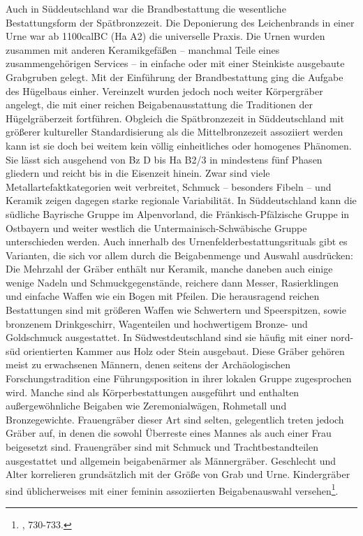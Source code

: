 \documentclass[openany,twoside,twocolumn]{book}
\let\rmarkdownfootnote\footnote%
\def\footnote{\protect\rmarkdownfootnote}
\begin{document}
Auch in Süddeutschland war die Brandbestattung die wesentliche
Bestattungsform der Spätbronzezeit. Die Deponierung des Leichenbrands in
einer Urne war ab 1100calBC (Ha A2) die universelle Praxis. Die Urnen
wurden zusammen mit anderen Keramikgefäßen -- manchmal Teile eines
zusammengehörigen Services -- in einfache oder mit einer Steinkiste
ausgebaute Grabgruben gelegt. Mit der Einführung der Brandbestattung
ging die Aufgabe des Hügelbaus einher. Vereinzelt wurden jedoch noch
weiter Körpergräber angelegt, die mit einer reichen Beigabenausstattung
die Traditionen der Hügelgräberzeit fortführen. Obgleich die
Spätbronzezeit in Süddeutschland mit größerer kultureller
Standardisierung als die Mittelbronzezeit assoziiert werden kann ist sie
doch bei weitem kein völlig einheitliches oder homogenes Phänomen. Sie
lässt sich ausgehend von Bz D bis Ha B2/3 in mindestens fünf Phasen
gliedern und reicht bis in die Eisenzeit hinein. Zwar sind viele
Metallartefaktkategorien weit verbreitet, Schmuck -- besonders Fibeln --
und Keramik zeigen dagegen starke regionale Variabilität. In
Süddeutschland kann die südliche Bayrische Gruppe im Alpenvorland, die
Fränkisch-Pfälzische Gruppe in Ostbayern und weiter westlich die
Untermainisch-Schwäbische Gruppe unterschieden werden. Auch innerhalb
des Urnenfelderbestattungsrituals gibt es Varianten, die sich vor allem
durch die Beigabenmenge und Auswahl ausdrücken: Die Mehrzahl der Gräber
enthält nur Keramik, manche daneben auch einige wenige Nadeln und
Schmuckgegenstände, reichere dann Messer, Rasierklingen und einfache
Waffen wie ein Bogen mit Pfeilen. Die herausragend reichen Bestattungen
sind mit größeren Waffen wie Schwertern und Speerspitzen, sowie
bronzenem Drinkgeschirr, Wagenteilen und hochwertigem Bronze- und
Goldschmuck ausgestattet. In Südwestdeutschland sind sie häufig mit
einer nord-süd orientierten Kammer aus Holz oder Stein ausgebaut. Diese
Gräber gehören meist zu erwachsenen Männern, denen seitens der
Archäologischen Forschungstradition eine Führungsposition in ihrer
lokalen Gruppe zugesprochen wird. Manche sind als Körperbestattungen
ausgeführt und enthalten außergewöhnliche Beigaben wie Zeremonialwägen,
Rohmetall und Bronzegewichte. Frauengräber dieser Art sind selten,
gelegentlich treten jedoch Gräber auf, in denen die sowohl Überreste
eines Mannes als auch einer Frau beigesetzt sind. Frauengräber sind mit
Schmuck und Trachtbestandteilen ausgestattet und allgemein beigabenärmer
als Männergräber. Geschlecht und Alter korrelieren grundsätzlich mit der
Größe von Grab und Urne. Kindergräber sind üblicherweises mit einer
feminin assoziierten Beigabenauswahl versehen\footnote{\textcite{jockenhovel_germany_2013},
  730-733.}.
\end{document}
